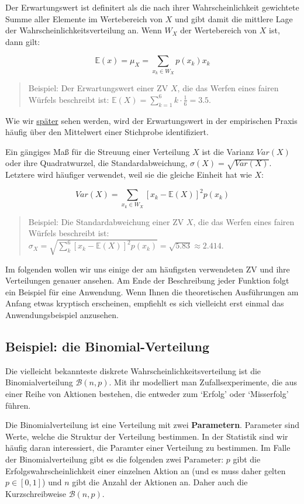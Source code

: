 \documentclass[]{book}
\begin{document}
Der Erwartungswert ist definitert als die nach ihrer Wahrscheinlichkeit
gewichtete Summe aller Elemente im Wertebereich von \(X\) und gibt damit
die mittlere Lage der Wahrscheinlichkeitsverteilung an. Wenn \(W_X\) der
Wertebereich von \(X\) ist, dann gilt:

\[\mathbb{E}(x)=\mu_X=\sum_{x_k\in W_X}p(x_k)x_k\]

\begin{quote}
Beispiel: Der Erwartungswert einer ZV \(X\), die das Werfen eines fairen
Würfels beschreibt ist:
\(\mathbb{E}(X)=\sum_{k=1}^6k\cdot\frac{1}{6}=3.5\).
\end{quote}

Wie wir \protect\hyperlink{stat-re}{später} sehen werden, wird der
Erwartungswert in der empirischen Praxis häufig über den Mittelwert
einer Stichprobe identifiziert.

Ein gängiges Maß für die Streuung einer Verteilung \(X\) ist die Varianz
\(Var(X)\) oder ihre Quadratwurzel, die Standardabweichung,
\(\sigma(X)=\sqrt{Var(X)}\). Letztere wird häufiger verwendet, weil sie
die gleiche Einheit hat wie \(X\):

\[Var(X)=\sum_{x_k\in W_X}\left[x_k-\mathbb{E}(X)\right]^2 p(x_k)\]

\begin{quote}
Beispiel: Die Standardabweichung einer ZV \(X\), die das Werfen eines
fairen Würfels beschreibt ist:
\(\sigma_X=\sqrt{\sum_{k}^6\left[x_k-\mathbb{E}(X)\right]^2 p(x_k)}=\sqrt{5.83}\approx 2.414\).
\end{quote}

Im folgenden wollen wir uns einige der am häufigsten verwendeten ZV und
ihre Verteilungen genauer ansehen. Am Ende der Beschreibung jeder
Funktion folgt ein Beispiel für eine Anwendung. Wenn Ihnen die
theoretischen Ausführungen am Anfang etwas kryptisch erscheinen,
empfiehlt es sich vielleicht erst einmal das Anwendungsbeispiel
anzusehen.

\subsection{Beispiel: die
Binomial-Verteilung}\label{beispiel-die-binomial-verteilung}

Die vielleicht bekannteste diskrete Wahrscheinlichkeitsverteilung ist
die Binomialverteilung \(\mathcal{B}(n,p)\). Mit ihr modelliert man
Zufallsexperimente, die aus einer Reihe von Aktionen bestehen, die
entweder zum `Erfolg' oder `Misserfolg' führen.

Die Binomialverteilung ist eine Verteilung mit zwei \textbf{Parametern}.
Parameter sind Werte, welche die Struktur der Verteilung bestimmen. In
der Statistik sind wir häufig daran interessiert, die Paramter einer
Verteilung zu bestimmen. Im Falle der Binomialverteilung gibt es die
folgenden zwei Parameter: \(p\) gibt die Erfolgswahrscheinlichkeit einer
einzelnen Aktion an (und es muss daher gelten \(p\in[0,1]\)) und \(n\)
gibt die Anzahl der Aktionen an. Daher auch die Kurzschreibweise
\(\mathcal{B}(n,p)\).
\end{document}
